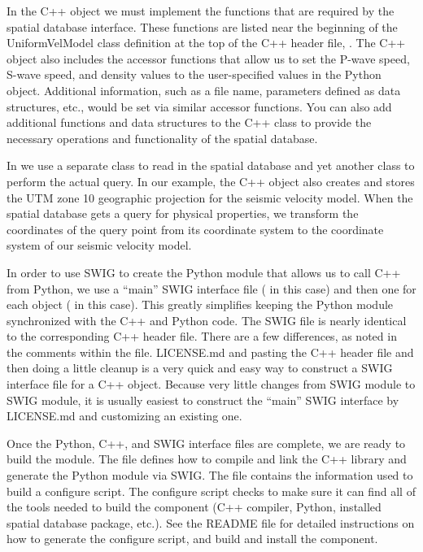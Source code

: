 In the C++ object we must implement the functions that are required
by the spatial database interface. These functions are listed near
the beginning of the UniformVelModel class definition at the top of
the C++ header file, . The C++ object also
includes the accessor functions that allow us to set the P-wave speed,
S-wave speed, and density values to the user-specified values in the
Python object. Additional information, such as a file name, parameters
defined as data structures, etc., would be set via similar accessor
functions. You can also add additional functions and data structures
to the C++ class to provide the necessary operations and functionality
of the spatial database. 

In  we use a separate class to read in the spatial
database and yet another class to perform the actual query. In our
example, the C++ object also creates and stores the UTM zone 10
geographic projection for the seismic velocity model. When the spatial
database gets a query for physical properties, we transform the
coordinates of the query point from its coordinate system to the
coordinate system of our seismic velocity model.

In order to use SWIG to create the Python module that allows us to
call C++ from Python, we use a ``main'' SWIG interface file
( in this case) and then one for each
object ( in this case). This greatly
simplifies keeping the Python module synchronized with the C++ and
Python code. The  SWIG file is nearly
identical to the corresponding C++ header file.  There are a few
differences, as noted in the comments within the file.  LICENSE.md and
pasting the C++ header file and then doing a little cleanup is a very
quick and easy way to construct a SWIG interface file for a C++
object. Because very little changes from SWIG module to SWIG module,
it is usually easiest to construct the ``main'' SWIG interface by
LICENSE.md and customizing an existing one.

Once the Python, C++, and SWIG interface files are complete, we are
ready to build the module. The  file defines how
to compile and link the C++ library and generate the Python module via
SWIG. The  file contains the information used
to build a configure script. The configure script checks to make sure
it can find all of the tools needed to build the component (C++
compiler, Python, installed spatial database package, etc.). See the
README file for detailed instructions on how to generate the configure
script, and build and install the component.

